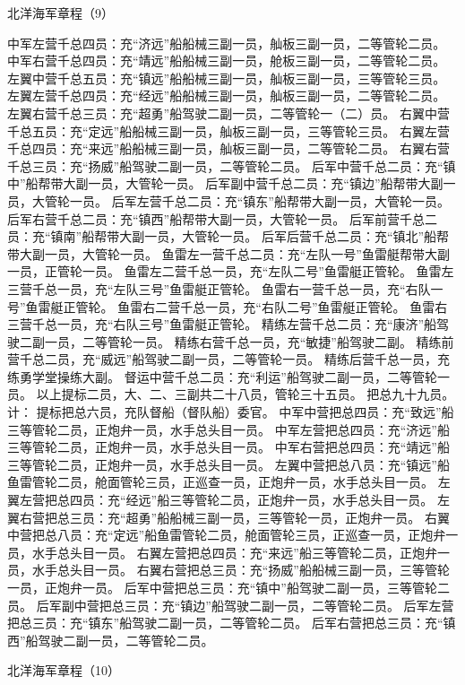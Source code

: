 \documentclass[12pt,UTF8]{ctexbook}
\begin{document}
北洋海军章程（9）

中军左营千总四员：充“济远”船船械三副一员，舢板三副一员，二等管轮二员。
中军右营千总四员：充“靖远”船船械三副一员，舱板三副一员，二等管轮二员。
左翼中营千总五员：充“镇远”船船械三副一员，舢板三副一员，三等管轮三员。
左翼左营千总四员：充“经远”船船械三副一员，舢板三副一员，二等管轮二员。
左翼右营千总三员：充“超勇”船驾驶二副一员，二等管轮一（二）员。
右翼中营千总五员：充“定远”船船械三副一员，舢板三副一员，三等管轮三员。
右翼左营千总四员：充“来远”船船械三副一员，舢板三副一员，二等管轮二员。
右翼右营千总三员：充“扬威”船驾驶二副一员，二等管轮二员。
后军中营千总二员：充“镇中”船帮带大副一员，大管轮一员。
后军副中营千总二员：充“镇边”船帮带大副一员，大管轮一员。
后军左营千总二员：充“镇东”船帮带大副一员，大管轮一员。
后军右营千总二员：充“镇西”船帮带大副一员，大管轮一员。
后军前营千总二员：充“镇南”船帮带大副一员，大管轮一员。
后军后营千总二员：充“镇北”船帮带大副一员，大管轮一员。
鱼雷左一营千总二员：充“左队一号”鱼雷艇帮带大副一员，正管轮一员。
鱼雷左二营千总一员，充“左队二号”鱼雷艇正管轮。
鱼雷左三营千总一员，充“左队三号”鱼雷艇正管轮。
鱼雷右一营千总一员，充“右队一号”鱼雷艇正管轮。
鱼雷右二营千总一员，充“右队二号”鱼雷艇正管轮。
鱼雷右三营千总一员，充“右队三号”鱼雷艇正管轮。
精练左营千总二员：充“康济”船驾驶二副一员，二等管轮一员。
精练右营千总一员，充“敏捷”船驾驶二副。
精练前营千总二员，充“威远”船驾驶二副一员，二等管轮一员。
精练后营千总一员，充练勇学堂操练大副。
督运中营千总二员：充“利运”船驾驶二副一员，二等管轮一员。
以上提标二员，大、二、三副共二十八员，管轮三十五员。
把总九十九员。计：
提标把总六员，充队督船（督队船）委官。
中军中营把总四员：充“致远”船三等管轮二员，正炮弁一员，水手总头目一员。
中军左营把总四员：充“济远”船三等管轮二员，正炮弁一员，水手总头目一员。
中军右营把总四员：充“靖远”船三等管轮二员，正炮弁一员，水手总头目一员。
左翼中营把总八员：充“镇远”船鱼雷管轮二员，舱面管轮三员，正巡查一员，正炮弁一员，水手总头目一员。
左翼左营把总四员：充“经远”船三等管轮二员，正炮弁一员，水手总头目一员。
左翼右营把总三员：充“超勇”船船械三副一员，三等管轮一员，正炮弁一员。
右翼中营把总八员：充“定远”船鱼雷管轮二员，舱面管轮三员，正巡查一员，正炮弁一员，水手总头目一员。
右翼左营把总四员：充“来远”船三等管轮二员，正炮弁一员，水手总头目一员。
右翼右营把总三员：充“扬威”船船械三副一员，三等管轮一员，正炮弁一员。
后军中营把总三员：充“镇中”船驾驶二副一员，三等管轮二员。
后军副中营把总三员：充“镇边”船驾驶二副一员，二等管轮二员。
后军左营把总三员：充“镇东”船驾驶二副一员，二等管轮二员。
后军右营把总三员：充“镇西”船驾驶二副一员，二等管轮二员。




北洋海军章程（10）
\end{document}

